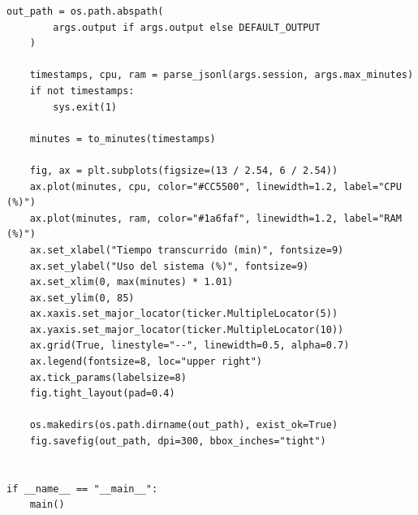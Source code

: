 \begin{lstlisting}[style=codefile, language=python3]
    out_path = os.path.abspath(
        args.output if args.output else DEFAULT_OUTPUT
    )

    timestamps, cpu, ram = parse_jsonl(args.session, args.max_minutes)
    if not timestamps:
        sys.exit(1)

    minutes = to_minutes(timestamps)

    fig, ax = plt.subplots(figsize=(13 / 2.54, 6 / 2.54))
    ax.plot(minutes, cpu, color="#CC5500", linewidth=1.2, label="CPU (%)")
    ax.plot(minutes, ram, color="#1a6faf", linewidth=1.2, label="RAM (%)")
    ax.set_xlabel("Tiempo transcurrido (min)", fontsize=9)
    ax.set_ylabel("Uso del sistema (%)", fontsize=9)
    ax.set_xlim(0, max(minutes) * 1.01)
    ax.set_ylim(0, 85)
    ax.xaxis.set_major_locator(ticker.MultipleLocator(5))
    ax.yaxis.set_major_locator(ticker.MultipleLocator(10))
    ax.grid(True, linestyle="--", linewidth=0.5, alpha=0.7)
    ax.legend(fontsize=8, loc="upper right")
    ax.tick_params(labelsize=8)
    fig.tight_layout(pad=0.4)

    os.makedirs(os.path.dirname(out_path), exist_ok=True)
    fig.savefig(out_path, dpi=300, bbox_inches="tight")


if __name__ == "__main__":
    main()
\end{lstlisting}
